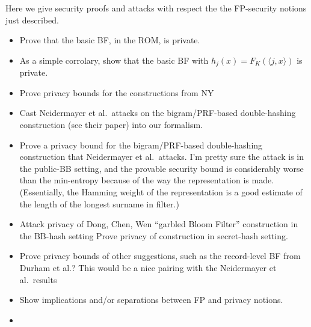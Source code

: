  Here we give security proofs and attacks with respect the the FP-security notions just described.
\begin{itemize}
\item Prove that the basic BF, in the ROM, is private.  

\item As a simple corrolary, show that the basic BF with $h_j(x)=F_K(\langle j,x \rangle)$ is private.  

\item Prove privacy bounds for the constructions from NY

\item Cast Neidermayer et al.\ attacks on the bigram/PRF-based double-hashing construction (see their paper) into our formalism.   

\item Prove a privacy bound for the bigram/PRF-based double-hashing construction that Neidermayer et al.\ attacks. I'm pretty sure the attack is in the public-BB setting, and the provable security bound is considerably worse than the min-entropy because of the way the representation is made.  (Essentially, the Hamming weight of the representation is a good estimate of the length of the longest surname in filter.)

\item Attack privacy of Dong, Chen, Wen ``garbled Bloom Filter'' construction in the BB-hash setting   Prove privacy of construction in secret-hash setting.  

\item Prove privacy bounds of other suggestions, such as the record-level BF from Durham et al.?  This would be a nice pairing with the Neidermayer et al.\ results

\item Show implications and/or separations between FP and privacy notions.

\item {}
\end{itemize}
